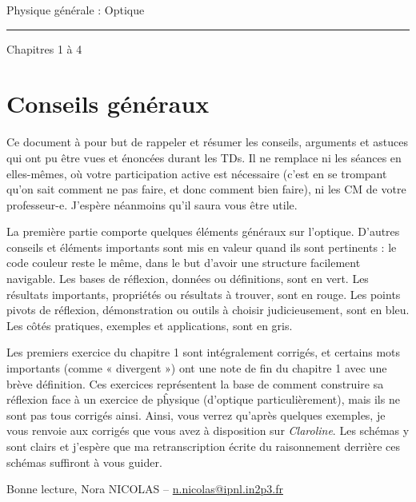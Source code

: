 \documentclass[10pt,a5paper,notitlepage]{book}
\begin{document}
\begin{center}
\Huge Physique générale : Optique\smallbreak\vspace*{-14pt}
\rule[11pt]{5cm}{0.5pt}\smallbreak\vspace*{-14pt}
\huge Chapitres 1 à 4
\end{center}

\toccontents

\setcounter{chapter}{-1}
\chapter{Conseils généraux}
\vspace*{-47pt}
Ce document à pour but de rappeler et résumer les conseils, arguments et astuces
qui ont pu être vues et énoncées durant les TDs. Il ne remplace ni les séances
en elles-mêmes, où votre participation active est nécessaire (c'est en se
trompant qu'on sait comment ne pas faire, et donc comment bien faire), ni les CM
de votre professeur-e. J'espère néanmoins qu'il saura vous être utile.
\smallbreak

La première partie comporte quelques éléments généraux sur l'optique. D'autres
conseils et éléments importants sont mis en valeur quand ils sont pertinents :
le code couleur reste le même, dans le but d'avoir une structure facilement
navigable. Les bases de réflexion, données ou définitions, sont en vert. Les
résultats importants, propriétés ou résultats à trouver, sont en rouge. Les
points pivots de réflexion, démonstration ou outils à choisir judicieusement,
sont en bleu. Les côtés pratiques, exemples et applications, sont en gris.
\smallbreak

Les premiers exercice du chapitre 1 sont intégralement corrigés, et certains
mots importants (comme « divergent ») ont une note de fin du chapitre 1 avec une
brève définition. Ces exercices représentent la base de comment construire sa
réflexion face à un exercice de pĥysique (d'optique particulièrement), mais ils
ne sont pas tous corrigés ainsi. Ainsi, vous verrez qu'après quelques exemples,
je vous renvoie aux corrigés que vous avez à disposition sur \textit{Claroline}.
Les schémas y sont clairs et j'espère que ma retranscription écrite du
raisonnement derrière ces schémas suffiront à vous guider. \smallbreak

Bonne lecture, \hfill Nora NICOLAS --
\href{mailto:n.nicolas@ipnl.in2p3.fr}{n.nicolas@ipnl.in2p3.fr}\\
\end{document}
